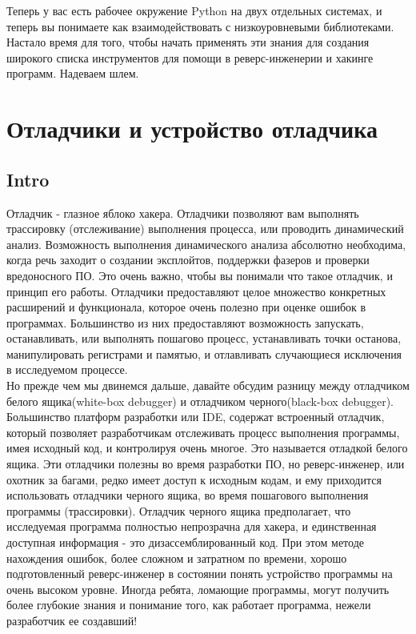 \documentclass[12pt, a4paper, oneside]{book}
\begin{document}
Теперь у вас есть рабочее окружение Python на двух отдельных системах, и теперь вы понимаете как взаимодействовать с низкоуровневыми библиотеками. Настало время для того, чтобы начать применять эти знания для создания широкого списка инструментов для помощи в реверс-инженерии и хакинге программ. Надеваем шлем.\\

\chapter{Отладчики и устройство отладчика}
\setcounter{subsection}{0}
\section*{Intro}

Отладчик - глазное яблоко хакера. Отладчики позволяют вам выполнять трассировку (отслеживание) выполнения процесса, или проводить динамический анализ. Возможность выполнения динамического анализа абсолютно необходима, когда речь заходит о создании эксплойтов, поддержки фазеров и проверки вредоносного ПО. Это очень важно, чтобы вы понимали что такое отладчик, и принцип его работы. Отладчики предоставляют целое множество конкретных расширений и функционала, которое очень полезно при оценке ошибок в программах. Большинство из них предоставляют возможность запускать, останавливать, или выполнять пошагово процесс, устанавливать точки останова, манипулировать регистрами и памятью, и отлавливать случающиеся исключения в исследуемом процессе.\\

Но прежде чем мы двинемся дальше, давайте обсудим разницу между отладчиком белого ящика(white-box debugger) и отладчиком черного(black-box debugger). Большинство платформ разработки или IDE, содержат встроенный отладчик, который позволяет разработчикам отслеживать процесс выполнения программы, имея исходный код, и контролируя очень многое. Это называется отладкой белого ящика. Эти отладчики полезны во время разработки ПО, но реверс-инженер, или охотник за багами, редко имеет доступ к исходным кодам, и ему приходится использовать отладчики черного ящика, во время пошагового выполнения программы (трассировки). Отладчик черного ящика предполагает, что исследуемая программа полностью непрозрачна для хакера, и единственная доступная информация - это дизассемблированный код. При этом методе нахождения ошибок, более сложном и затратном по времени, хорошо подготовленный реверс-инженер в состоянии понять устройство программы на очень высоком уровне. Иногда ребята, ломающие программы, могут получить более глубокие знания и понимание того, как работает программа, нежели разработчик ее создавший!\\
\end{document}
